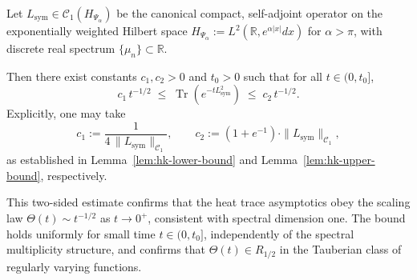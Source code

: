 \begin{proposition}
\label{prop:two-sided-heat-trace-bounds}
Let \( L_{\mathrm{sym}} \in \mathcal{C}_1(H_{\Psi_\alpha}) \) be the canonical compact, self-adjoint operator on the exponentially weighted Hilbert space \( H_{\Psi_\alpha} := L^2(\mathbb{R}, e^{\alpha|x|} dx) \) for \( \alpha > \pi \), with discrete real spectrum \( \{\mu_n\} \subset \mathbb{R} \).

Then there exist constants \( c_1, c_2 > 0 \) and \( t_0 > 0 \) such that for all \( t \in (0, t_0] \),
\[
c_1\, t^{-1/2}
\;\le\;
\operatorname{Tr}\left( e^{-t L_{\mathrm{sym}}^2} \right)
\;\le\;
c_2\, t^{-1/2}.
\]
Explicitly, one may take
\[
c_1 := \frac{1}{4 \, \| L_{\mathrm{sym}} \|_{\mathcal{C}_1}}, \qquad
c_2 := (1 + e^{-1}) \cdot \| L_{\mathrm{sym}} \|_{\mathcal{C}_1},
\]
as established in Lemma~\ref{lem:hk-lower-bound} and Lemma~\ref{lem:hk-upper-bound}, respectively.

\medskip

\noindent
This two-sided estimate confirms that the heat trace asymptotics obey the scaling law \( \Theta(t) \sim t^{-1/2} \) as \( t \to 0^+ \), consistent with spectral dimension one. The bound holds uniformly for small time \( t \in (0, t_0] \), independently of the spectral multiplicity structure, and confirms that \( \Theta(t) \in R_{1/2} \) in the Tauberian class of regularly varying functions.
\end{proposition}
